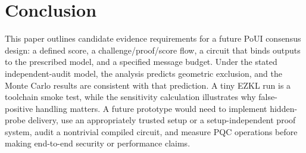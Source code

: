 \documentclass[conference]{IEEEtran}
\begin{document}
\section{Conclusion}
\label{sec:conclusion}

This paper outlines candidate evidence requirements for a future PoUI consensus design: a defined score, a challenge/proof/score flow, a circuit that binds outputs to the prescribed model, and a specified message budget. Under the stated independent-audit model, the analysis predicts geometric exclusion, and the Monte Carlo results are consistent with that prediction. A tiny EZKL run is a toolchain smoke test, while the sensitivity calculation illustrates why false-positive handling matters. A future prototype would need to implement hidden-probe delivery, use an appropriately trusted setup or a setup-independent proof system, audit a nontrivial compiled circuit, and measure PQC operations before making end-to-end security or performance claims.






\end{document}

